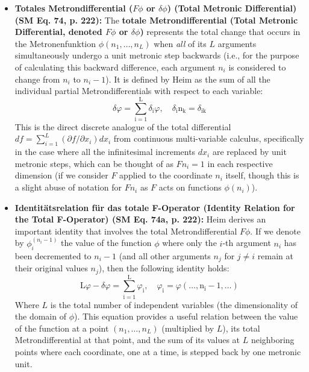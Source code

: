 \documentclass[12pt]{article}
\begin{document}
\begin{itemize}
    \item \textbf{Totales Metrondifferential (\( F\phi \) or \( \delta\phi \)) (Total Metronic Differential) (SM Eq. 74, p. 222):}
    The \textbf{totale Metrondifferential (Total Metronic Differential, denoted \( F\phi \) or \( \delta\phi \))} represents the total change that occurs in the Metronenfunktion \( \phi(n_1, \dots, n_L) \) when \textit{all} of its \( L \) arguments simultaneously undergo a unit metronic step backwards (i.e., for the purpose of calculating this backward difference, each argument \( n_i \) is considered to change from \( n_i \) to \( n_i-1 \)). It is defined by Heim as the sum of all the individual partial Metrondifferentials with respect to each variable:
    \begin{equation}
    \delta\varphi = \sum_{\mathrm{i}=1}^\mathrm{L} \delta_{\mathrm{i}}\varphi, \quad \delta_{\mathrm{i}}\mathrm{n_k} = \delta_{\mathrm{ik}} \tag{74}
    \label{eq:original_total_metrondifferential}
    \end{equation}
    This is the direct discrete analogue of the total differential \( df = \sum_{i=1}^L (\partial f/\partial x_i)dx_i \) from continuous multi-variable calculus, specifically in the case where all the infinitesimal increments \( dx_i \) are replaced by unit metronic steps, which can be thought of as \( Fn_i = 1 \) in each respective dimension (if we consider \( F \) applied to the coordinate \(n_i\) itself, though this is a slight abuse of notation for \(Fn_i\) as \(F\) acts on functions \(\phi(n_i)\)).

    \item \textbf{Identitätsrelation für das totale F-Operator (Identity Relation for the Total F-Operator) (SM Eq. 74a, p. 222):}
    Heim derives an important identity that involves the total Metrondifferential \( F\phi \). If we denote by \( \phi_i^{(n_i-1)} \) the value of the function \( \phi \) where only the \( i \)-th argument \( n_i \) has been decremented to \( n_i-1 \) (and all other arguments \( n_j \) for \( j\neq i \) remain at their original values \( n_j \)), then the following identity holds:
    \begin{equation}
    \mathrm{L}\varphi - \delta\varphi = \sum_{\mathrm{i}=1}^\mathrm{L} \varphi_{\mathrm{i}}, \quad \varphi_{\mathrm{i}} = \varphi(\dots, \mathrm{n_i}-1, \dots) \tag{74a}
    \end{equation}
    Where \( L \) is the total number of independent variables (the dimensionality of the domain of \( \phi \)). This equation provides a useful relation between the value of the function at a point \( (n_1, \dots, n_L) \) (multiplied by \( L \)), its total Metrondifferential at that point, and the sum of its values at \( L \) neighboring points where each coordinate, one at a time, is stepped back by one metronic unit.


\end{itemize}
\end{document}

